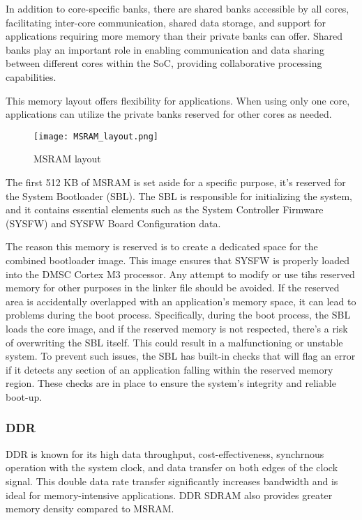 In addition to core-specific banks, there are shared banks accessible by all
cores, facilitating inter-core communication, shared data storage, and support
for applications requiring more memory than their private banks can offer.
Shared banks play an important role in enabling communication and data sharing
between different cores within the SoC, providing collaborative processing
capabilities.

This memory layout offers flexibility for applications. When using only one
core, applications can utilize the private banks reserved for other cores as
needed.

\begin{figure}[ht]
    \centering
    \texttt{[image: MSRAM\_layout.png]}
    \caption{MSRAM layout}
\end{figure}

The first 512 KB of MSRAM is set aside for a specific purpose, it's reserved
for the System Bootloader (SBL). The SBL is responsible for initializing the
system, and it contains essential elements such as the System Controller
Firmware (SYSFW) and SYSFW Board Configuration data.

The reason this memory is reserved is to create a dedicated space for the
combined bootloader image. This image ensures that SYSFW is properly loaded
into the DMSC Cortex M3 processor. Any attempt to modify or use tihs reserved
memory for other purposes in the linker file should be avoided. If the
reserved area is accidentally overlapped with an application's memory space,
it can lead to problems during the boot process.
Specifically, during the boot process, the SBL loads the core image, and if the
reserved memory is not respected, there's a risk of overwriting the SBL itself.
This could result in a malfunctioning or unstable system. To prevent such
issues, the SBL has built-in checks that will flag an error if it detects any
section of an application falling within the reserved memory region. These
checks are in place to ensure the system's integrity and reliable boot-up.

\subsubsection{DDR}

DDR is known for its high data throughput, cost-effectiveness, synchrnous
operation with the system clock, and data transfer on both edges of the clock
signal. This double data rate transfer significantly increases bandwidth and
is ideal for memory-intensive applications. DDR SDRAM also provides greater
memory density compared to MSRAM.

